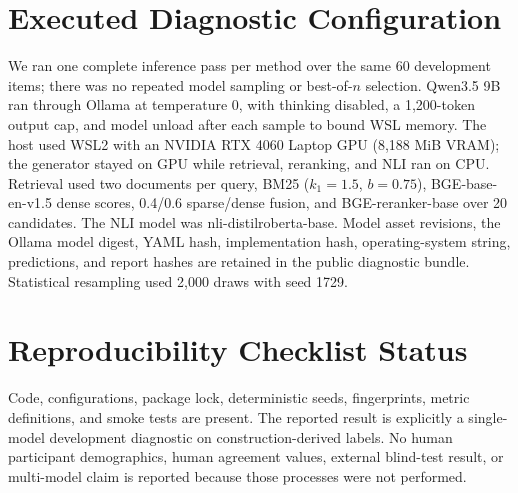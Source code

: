 \documentclass[letterpaper]{article}
\begin{document}
\section{Executed Diagnostic Configuration}
We ran one complete inference pass per method over the same 60 development
items; there was no repeated model sampling or best-of-$n$ selection. Qwen3.5
9B ran through Ollama at temperature 0, with thinking disabled, a 1,200-token
output cap, and model unload after each sample to bound WSL memory. The host used
WSL2 with an NVIDIA RTX 4060 Laptop GPU (8,188 MiB VRAM); the generator stayed
on GPU while retrieval, reranking, and NLI ran on CPU. Retrieval used two
documents per query, BM25 ($k_1=1.5$, $b=0.75$), BGE-base-en-v1.5 dense scores,
0.4/0.6 sparse/dense fusion, and BGE-reranker-base over 20 candidates. The
NLI model was nli-distilroberta-base. Model asset revisions, the Ollama model
digest, YAML hash, implementation hash, operating-system string, predictions,
and report hashes are retained in the public diagnostic bundle. Statistical
resampling used 2,000 draws with seed 1729.

\section{Reproducibility Checklist Status}
Code, configurations, package lock, deterministic seeds, fingerprints, metric
definitions, and smoke tests are present. The reported result is explicitly a
single-model development diagnostic on construction-derived labels. No human
participant demographics, human agreement values, external blind-test result,
or multi-model claim is reported because those processes were not performed.
\end{document}
